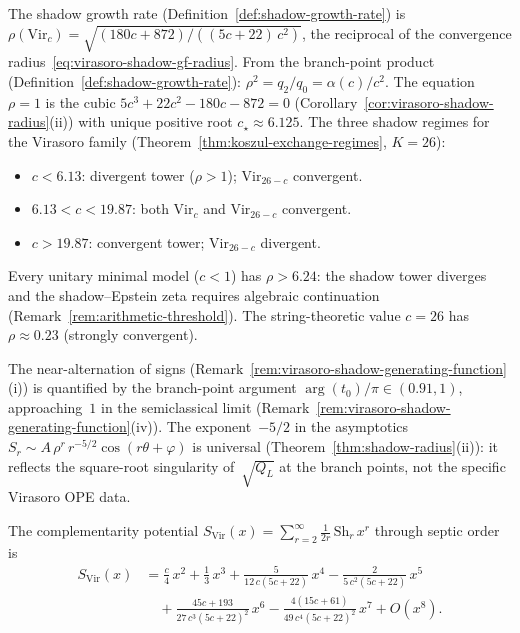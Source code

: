 \begin{remark}
\label{rem:virasoro-shadow-growth-rate}
The shadow growth rate
(Definition~\ref{def:shadow-growth-rate}) is
$\rho(\mathrm{Vir}_c)
= \sqrt{(180c{+}872)/((5c{+}22)\,c^2)}$,
the reciprocal of the convergence
radius~\eqref{eq:virasoro-shadow-gf-radius}.
From the branch-point product
(Definition~\ref{def:shadow-growth-rate}):
$\rho^2 = q_2/q_0 = \alpha(c)/c^2$.
The equation $\rho = 1$ is the cubic
$5c^3 + 22c^2 - 180c - 872 = 0$
(Corollary~\ref{cor:virasoro-shadow-radius}(ii))
with unique positive root
$c_\star \approx 6.125$.
The three shadow regimes for the Virasoro family
(Theorem~\ref{thm:koszul-exchange-regimes}, $K = 26$):
\begin{itemize}[nosep]
\item $c < 6.13$: divergent tower ($\rho > 1$);
  $\mathrm{Vir}_{26-c}$ convergent.
\item $6.13 < c < 19.87$: both $\mathrm{Vir}_c$
  and $\mathrm{Vir}_{26-c}$ convergent.
\item $c > 19.87$: convergent tower; $\mathrm{Vir}_{26-c}$
  divergent.
\end{itemize}
Every unitary minimal model ($c < 1$) has
$\rho > 6.24$: the shadow tower diverges and the
shadow--Epstein zeta requires algebraic continuation
(Remark~\ref{rem:arithmetic-threshold}).
The string-theoretic value $c = 26$ has
$\rho \approx 0.23$ (strongly convergent).

The near-alternation of
signs (Remark~\ref{rem:virasoro-shadow-generating-function}(i))
is quantified by the branch-point argument
$\arg(t_0)/\pi \in (0.91, 1)$, approaching~$1$ in the
semiclassical limit (Remark~\ref{rem:virasoro-shadow-generating-function}(iv)).  The exponent~$-5/2$ in the
asymptotics
$S_r \sim A\,\rho^r\,r^{-5/2}\cos(r\theta + \varphi)$
is universal (Theorem~\ref{thm:shadow-radius}(ii)):
it reflects the square-root singularity of~$\sqrt{Q_L}$ at
the branch points, not the specific Virasoro OPE data.
\end{remark}

\begin{remark}
\label{rem:virasoro-complementarity-potential}
The complementarity potential
$S_{\mathrm{Vir}}(x) = \sum_{r=2}^\infty \frac{1}{2r}\,
\mathrm{Sh}_r\,x^r$ through septic order is
\begin{align*}
S_{\mathrm{Vir}}(x)
&= \frac{c}{4}\,x^2
+ \frac{1}{3}\,x^3
+ \frac{5}{12\,c(5c{+}22)}\,x^4
- \frac{2}{5\,c^2(5c{+}22)}\,x^5 \\
&\quad + \frac{45c{+}193}{27\,c^3(5c{+}22)^2}\,x^6
- \frac{4(15c{+}61)}{49\,c^4(5c{+}22)^2}\,x^7
+ O(x^8).
\end{align*}
\end{remark}

